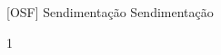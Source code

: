 \documentclass[\mainfilename]{subfiles}
\begin{document}

[OSF]
{Sendimentação} %
{Sendimentação} %

\begin{sectionBox}1{} %
    
    
    
\end{sectionBox}
\end{document}

